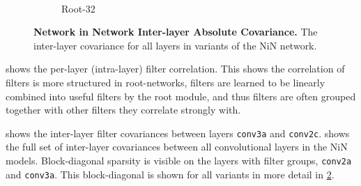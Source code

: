 \documentclass[thesis]{subfiles}
\begin{document}
{\begin{landscape}
\begin{figure}[p]
\begin{subfigure}[c]{0.95\linewidth}
					~
					\caption{Root-32}
					\label{fig:covarroot32}
				\end{subfigure}
				\caption[Inter-layer covariance (all layers).]{\textbf{Network in Network Inter-layer Absolute Covariance.} The inter-layer covariance for all layers in variants of the NiN network.}
				\label{fig:suppcovariances}
			\end{figure}
		\end{landscape}
	}%
	
	 shows the per-layer (intra-layer) filter correlation. This shows the correlation of filters is more structured in root-networks, filters are learned to be linearly combined into useful filters by the root module, and thus filters are often grouped together with other filters they correlate strongly with.
	
	 shows the inter-layer filter covariances between layers \texttt{conv3a} and \texttt{conv2c}.  shows the full set of inter-layer covariances between all convolutional layers in the NiN models. Block-diagonal sparsity is visible on the layers with filter groups, \texttt{conv2a} and \texttt{conv3a}. This block-diagonal is shown for all variants in more detail in \cref{fig:suppcovariances}.
	
\end{document}
